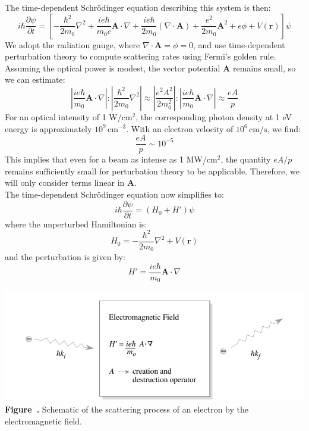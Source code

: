 The time-dependent Schrödinger equation describing this system is then:
\begin{equation}
	i \hbar \frac{\partial \psi}{\partial t} = \left[
		- \frac{\hbar^2}{2m_0} \nabla^2
		+ \frac{i e \hbar}{m_0 c} \mathbf{A} \cdot \nabla
		+ \frac{i e \hbar}{2 m_0} (\nabla \cdot \mathbf{A})
		+ \frac{e^2}{2 m_0} \mathbf{A}^2
		+ e \phi + V(\mathbf{r})
		\right] \psi
\end{equation}
We adopt the radiation gauge, where \( \nabla \cdot \mathbf{A} = \phi = 0 \), and use time-dependent perturbation theory to compute scattering rates using Fermi’s golden rule. Assuming the optical power is modest, the vector potential \( \mathbf{A} \) remains small, so we can estimate:
\begin{equation}
	\left| \frac{i e \hbar}{m_0} \mathbf{A} \cdot \nabla \right| : \left| \frac{\hbar^2}{2m_0} \nabla^2 \right| \approx \left| \frac{e^2 A^2}{2m_0^2} \right| : \left| \frac{i e \hbar}{m_0} \mathbf{A} \cdot \nabla \right| \approx \frac{eA}{p}
\end{equation}
For an optical intensity of 1 W/cm\(^2\), the corresponding photon density at 1 eV energy is approximately \( 10^9 \,\text{cm}^{-3} \). With an electron velocity of \( 10^6 \,\text{cm/s} \), we find:
\begin{equation}
	\frac{eA}{p} \sim 10^{-5}
\end{equation}
This implies that even for a beam as intense as 1 MW/cm\(^2\), the quantity \( eA/p \) remains sufficiently small for perturbation theory to be applicable. Therefore, we will only consider terms linear in \( \mathbf{A} \).\\
The time-dependent Schrödinger equation now simplifies to:
\begin{equation}
	i \hbar \frac{\partial \psi}{\partial t} = (H_0 + H') \psi
\end{equation}
where the unperturbed Hamiltonian is:
\begin{equation}
	H_0 = -\frac{\hbar^2}{2m_0} \nabla^2 + V(\mathbf{r})
\end{equation}
and the perturbation is given by:
\begin{equation}
	H' = \frac{i e \hbar}{m_0} \mathbf{A} \cdot \nabla
\end{equation}
\begin{center}
	\begin{minipage}{0.8\textwidth}
		\centering
		\includegraphics[width=\textwidth]{img/Scattering.png}
		\\[0.5em]
		\textbf{Figure~\thefigure.} Schematic of the scattering process of an electron by the electromagnetic field.
		\label{fig:Scattering}
	\end{minipage}
\end{center}
